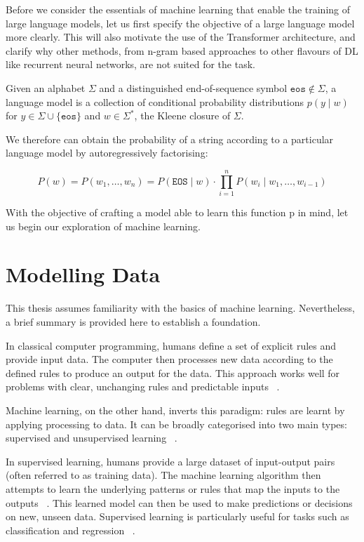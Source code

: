 \documentclass[a4paper, oneside]{discothesis}
\begin{document}
Before we consider the essentials of machine learning that enable the training of large language models, let us first specify the objective of a large language model more clearly. 
This will also motivate the use of the Transformer architecture, and clarify why other methods, from n-gram based approaches to other flavours of DL like recurrent neural networks, are not suited for the task.

\begin{theorem} \label{thm:first theorem}
    Given an alphabet $\Sigma$ and a distinguished end-of-sequence symbol $\texttt{eos} \notin \Sigma$, a
    language model is a collection of conditional probability distributions $p(y \mid w)$ for $y \in \Sigma \cup \{\texttt{eos}\}$ and $w \in \Sigma^*$,
    the Kleene closure of $\Sigma$.
\end{theorem}

We therefore can obtain the probability of a string according to a particular language model by autoregressively factorising:

\begin{equation}
    P(w) = P(w_1, \ldots, w_n) =  P(\texttt{EOS} \mid w) \cdot \prod_{i=1}^n P(w_i \mid w_1, \ldots, w_{i-1}) 
\end{equation}

With the objective of crafting a model able to learn this function p in mind, let us begin our exploration of machine learning. 

\section{Modelling Data}

This thesis assumes familiarity with the basics of machine learning. Nevertheless, a brief summary is provided here to establish a foundation.

In classical computer programming, humans define a set of explicit rules and provide input data. The computer then processes new data according to the defined rules to produce an output for the data. This approach works well for problems with clear, unchanging rules and predictable inputs ~\cite{russell2010artificial}.

Machine learning, on the other hand, inverts this paradigm: rules are learnt by applying processing to data. It can be broadly categorised into two main types: supervised and unsupervised learning ~\cite{murphy2012machine}.

In supervised learning, humans provide a large dataset of input-output pairs (often referred to as training data). 
The machine learning algorithm then attempts to learn the underlying patterns or rules that map the inputs to the outputs ~\cite{hastie2009elements}. 
This learned model can then be used to make predictions or decisions on new, unseen data.
Supervised learning is particularly useful for tasks such as classification and regression ~\cite{bishop2006pattern}.
\end{document}
